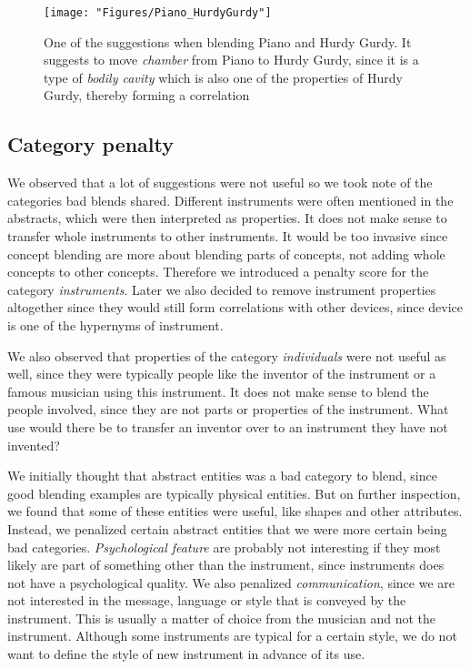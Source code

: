 \begin{figure}
	\centering
	\texttt{[image: "Figures/Piano\_HurdyGurdy"]}
	\caption{One of the suggestions when blending Piano and Hurdy Gurdy. It suggests to move \emph{chamber} from Piano to Hurdy Gurdy, since it is a type of \emph{bodily cavity} which is also one of the properties of Hurdy Gurdy, thereby forming a correlation }
	\label{fig:piano-hurdy-gurdy}
\end{figure}

\subsection{Category penalty}
We observed that a lot of suggestions were not useful so we took note of the categories bad blends shared. Different instruments were often mentioned in the abstracts, which were then interpreted as properties. It does not make sense to transfer whole instruments to other instruments. It would be too invasive since concept blending are more about blending parts of concepts, not adding whole concepts to other concepts. Therefore we introduced a penalty score for the category \emph{instruments}. Later we also decided to remove instrument properties altogether since they would still form correlations with other devices, since device is one of the hypernyms of instrument.

We also observed that properties of the category \emph{individuals} were not useful as well, since they were typically people like the inventor of the instrument or a famous musician using this instrument. It does not make sense to blend the people involved, since they are not parts or properties of the instrument. What use would there be to transfer an inventor over to an instrument they have not invented?

We initially thought that abstract entities was a bad category to blend, since good blending examples are typically physical entities. But on further inspection, we found that some of these entities were useful, like shapes and other attributes. Instead, we penalized certain abstract entities that we were more certain being bad categories. \emph{Psychological feature} are probably not interesting if they most likely are part of something other than the instrument, since instruments does not have a psychological quality. We also penalized \emph{communication}, since we are not interested in the message, language or style that is conveyed by the instrument. This is usually a matter of choice from the musician and not the instrument. Although some instruments are typical for a certain style, we do not want to define the style of new instrument in advance of its use.

